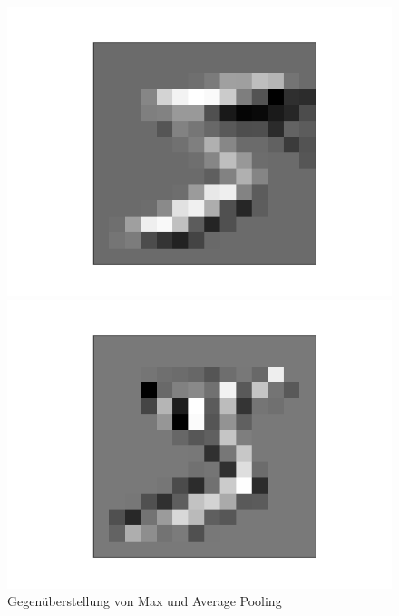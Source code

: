 \documentclass[11pt]{article}
\begin{document}
\begin{figure}[h]
\begin{minipage}{0.2\linewidth}
	\includegraphics[width=\linewidth]{../graphics/mnist_5/conv_pool/lower_horiz_avgpooled.png}
\end{minipage}
\hfill
\begin{minipage}{0.2\linewidth}
	\centering
	\includegraphics[width=\linewidth]{../graphics/mnist_5/conv_pool/right_vert_avgpooled.png}
\end{minipage}
\caption{Gegenüberstellung von Max und Average Pooling}
\label{Pooling_Mnist}
\end{figure}
\\
\end{document}
